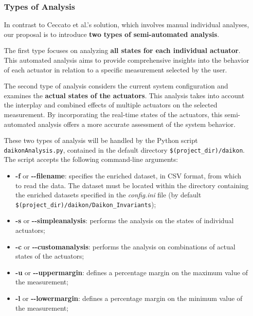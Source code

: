 \subsubsection{Types of Analysis}
\label{subsub:4_types_analysis}

In contrast to Ceccato et al.'s solution, which involves manual individual analyses, our proposal is to introduce \textbf{two types of semi-automated analysis}.

The first type focuses on analyzing \textbf{all states for each individual actuator}. This automated analysis aims to provide comprehensive insights into the behavior of each actuator in relation to a specific measurement selected by the user.

The second type of analysis considers the current system configuration and examines the \textbf{actual states of the actuators}. This analysis takes into account the interplay and combined effects of multiple actuators on the selected measurement. By incorporating the real-time states of the actuators, this semi-automated analysis offers a more accurate assessment of the system behavior.

\bigskip
These two types of analysis will be handled by the Python script\\ \texttt{daikonAnalysis.py}, contained in the default directory \texttt{\$(project\_dir)/daikon}.\newline
The script accepts the following command-line arguments:

\begin{itemize}
	\item \textbf{-f} or \textbf{{-}{-}filename}: specifies the enriched dataset, in CSV format, from which to read the data. The dataset must be located within the directory containing the enriched datasets specified in the \textit{config.ini} file (by default \texttt{\$(project\_dir)/daikon/Daikon\_Invariants});
	
	\item \textbf{-s} or \textbf{{-}{-}simpleanalysis}: performs the analysis on the states of individual actuators;
	
	\item \textbf{-c} or \textbf{{-}{-}customanalysis}: performs the analysis on combinations of actual states of the actuators;
	
	\item \textbf{-u} or \textbf{{-}{-}uppermargin}: defines a percentage margin on the maximum value of the measurement;
	
	\item \textbf{-l} or \textbf{{-}{-}lowermargin}: defines a percentage margin on the minimum value of the measurement;
\end{itemize}

